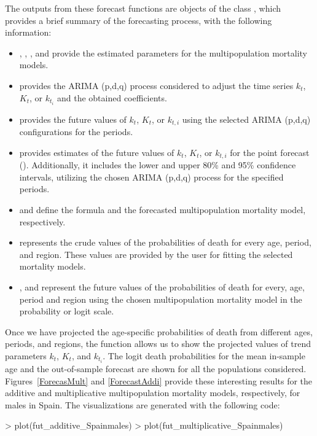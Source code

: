 The outputs from these forecast functions are objects of the class , which provides a brief summary of the forecasting process, with the following information:
\begin{itemize}
\item {}, , , and  provide the estimated parameters for the multipopulation mortality models.
\item {} provides the ARIMA (p,d,q) process considered to adjust the time series $k_t$, $K_t$, or $k_{t_i}$ and the obtained coefficients.
\item {} provides the future values of $k_t$, $K_t$, or $k_{t,i}$ using the selected ARIMA (p,d,q) configurations for the  periods.
\item {} provides estimates of the future values of $k_t$, $K_t$, or $k_{t,i}$ for the point forecast (). Additionally, it includes the lower and upper 80\% and 95\% confidence intervals, utilizing the chosen ARIMA (p,d,q) process for the specified  periods.
\item {} and  define the  formula and the forecasted multipopulation mortality model, respectively.
\item {} represents the crude values of the probabilities of death for every age, period, and region. These values are provided by the user for fitting the selected mortality models.
\item {}, and  represent the future values of the probabilities of death for every, age, period and region using the chosen multipopulation mortality model in the probability or logit scale.
\end{itemize}

Once we have projected the age-specific probabilities of death from different ages, periods, and regions, the  function allows us to show the projected values of trend parameters $k_t$, $K_t$, and $k_{t_i}$. The logit death probabilities for the mean in-sample age and the out-of-sample forecast are shown for all the populations considered. Figures~\ref{ForecasMult} and \ref{ForecastAddi} provide these interesting results for the additive and multiplicative multipopulation mortality models, respectively, for males in Spain. The visualizations are generated with the following code:
%
\begin{example}
> plot(fut_additive_Spainmales)
> plot(fut_multiplicative_Spainmales)
\end{example}
%


